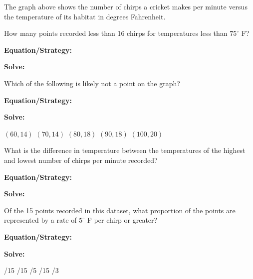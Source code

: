 The graph above shows the number of chirps a cricket makes per minute versus the temperature of its habitat in degrees Fahrenheit.

\begin{multicols*}{2}
\begin{outline}[enumerate]
\medium

\1 How many points recorded less than 16 chirps for temperatures less than $75^\circ$ F?

\bigskip
\textbf{Equation/Strategy:} \hrulefill

\bigskip
\textbf{Solve:}

\vfill
{}

\midline

\1 Which of the following is likely not a point on the graph?

\bigskip
\textbf{Equation/Strategy:} \hrulefill

\bigskip
\textbf{Solve:}

\vfill
\2 $(60,14)$
\2 $(70,14)$
\2 $(80,18)$
\2 $(90,18)$
\2 $(100,20)$

\columnbreak
\advanced

\1 What is the difference in temperature between the temperatures of the highest and lowest number of chirps per minute recorded?

\bigskip
\textbf{Equation/Strategy:}

\bigskip
\textbf{Solve:}

\vfill
{}

\midline

\1 Of the 15 points recorded in this dataset, what proportion of the points are represented by a rate of $5^\circ$ F per chirp or greater?

\bigskip
\textbf{Equation/Strategy:} \hrulefill

\bigskip
\textbf{Solve:}

\vfill
{}/15
/15
/5
/15
/3
\end{outline}
\end{multicols*}